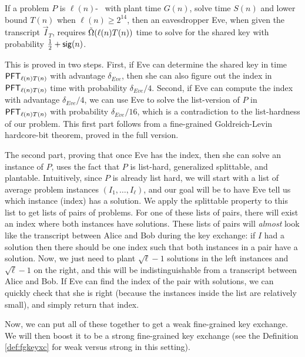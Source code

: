 \begin{lemma}\label{lem:eve-time}
	If a problem $P$ is $\ell(n)$-\keyER~ with plant time $G(n)$, solve time $S(n)$ and lower bound $T(n)$ when $\ell(n)\ge 2^{14}$,
	then an eavesdropper Eve, when given the transcript $\vec I_T$, requires $\~\Omega(\ell(n) T(n))$ time to solve for the shared key with probability $\frac{1}{2}+\sig(n)$.
\end{lemma}
\begin{proof-sketch}
	This is proved in two steps. First, if Eve can determine the shared key in time $\PFT{\ell(n)T(n)}$ with advantage $\delta_{Eve}$, then she can also figure out the index in $\PFT{\ell(n)T(n)}$ time with probability $\delta_{Eve}/4$. Second, if Eve can compute the index with advantage $\delta_{Eve}/4$, we can use Eve to solve the list-version of $P$ in $\PFT{\ell(n)T(n)}$ with probability $\delta_{Eve}/16$, which is a contradiction to the list-hardness of our problem. This first part follows from a fine-grained Goldreich-Levin hardcore-bit theorem, proved in the full version.
	
	The second part, proving that once Eve has the index, then she can solve an instance of $P$, uses the fact that $P$ is list-hard, generalized splittable, and plantable. Intuitively, since $P$ is already list hard, we will start with a list of average problem instances $(I_1, \ldots, I_{\ell})$, and our goal will be to have Eve tell us which instance (index) has a solution. We apply the splittable property to this list to get lists of pairs of problems. For one of these lists of pairs, there will exist an index where both instances have solutions. These lists of pairs will \emph{almost} look like the transcript between Alice and Bob during the key exchange: if $I$ had a solution then there should be one index such that both instances in a pair have a solution. Now, we just need to plant $\sqrt{\ell} - 1$ solutions in the left instances and $\sqrt{\ell} - 1$ on the right, and this will be indistinguishable from a transcript between Alice and Bob. If Eve can find the index of the pair with solutions, we can quickly check that she is right (because the instances inside the list are relatively small), and simply return that index.
\end{proof-sketch}

Now, we can put all of these together to get a weak fine-grained key exchange. We will then boost it to be a strong fine-grained key exchange (see the Definition \ref{def:fgkeyxc} for weak versus strong in this setting).

